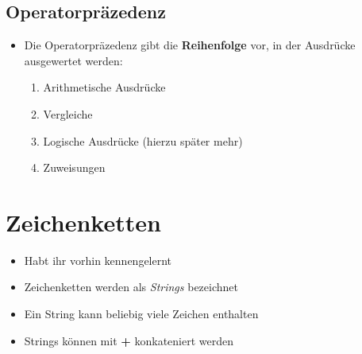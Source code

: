 	\subsection{Operatorpräzedenz}
	\begin{frame}
		\slidehead

		\pause

		\begin{itemize}
			\item Die Operatorpräzedenz gibt die \textbf{Reihenfolge} vor, in der Ausdrücke ausgewertet werden:
			\begin{enumerate}
				\item Arithmetische Ausdrücke
				\item Vergleiche
				\item Logische Ausdrücke (hierzu später mehr)
				\item Zuweisungen
			\end{enumerate}
		\end{itemize}
	\end{frame}

	\section{Zeichenketten}

	\begin{frame}
		\slidehead
		\begin{itemize}
			\item Habt ihr vorhin kennengelernt
			\pause
			\item Zeichenketten werden als \textit{Strings} bezeichnet
			\item Ein String kann beliebig viele Zeichen enthalten
			\pause
			\item Strings können mit \textbf{+} konkateniert werden
		\end{itemize}
	\end{frame}




